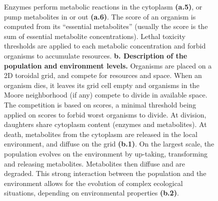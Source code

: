 \begin{figure}
{Enzymes perform metabolic reactions in the cytoplasm \textbf{(a.5)}, or pump metabolites in or out \textbf{(a.6)}. The score of an organism is computed from its ``essential metabolites''
(usually the score is the sum of essential metabolite concentrations). Lethal toxicity thresholds are applied to each metabolic concentration and forbid organisms to accumulate resources. \textbf{b. Description of the population and environment levels.} Organisms are placed on a 2D toroidal grid, and compete for resources and space. When an organism dies, it leaves its grid cell empty and organisms in the Moore neighborhood (if any) compete to divide in available space. The competition is based on scores, a minimal threshold being applied on scores to forbid worst organisms to divide. At division, daughters share cytoplasm content (enzymes and metabolites). At death, metabolites from the cytoplasm are released in the local environment, and diffuse on the grid \textbf{(b.1)}. On the largest scale, the population evolves on the environment by up-taking, transforming and releasing metabolites. Metabolites then diffuse and are degraded. This strong interaction between the population and the environment allows for the evolution of complex ecological situations, depending on environmental properties \textbf{(b.2)}.}
\label{general_algorithm}
\end{figure}
